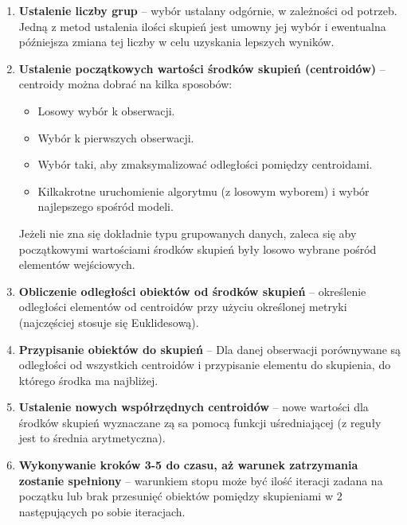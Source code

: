 \begin{enumerate}
	\item \textbf{Ustalenie liczby grup} -- wybór ustalany odgórnie, w zależności od potrzeb. Jedną z metod ustalenia ilości skupień jest umowny jej wybór i ewentualna późniejsza zmiana tej liczby w celu uzyskania lepszych wyników.
	\item \textbf{Ustalenie początkowych wartości środków skupień (centroidów)} -- centroidy można dobrać na kilka sposobów:
	\begin{itemize}
		\item Losowy wybór k obserwacji.
		\item Wybór k pierwszych obserwacji.
		\item Wybór taki, aby zmaksymalizować odległości pomiędzy centroidami.
		\item Kilkakrotne uruchomienie algorytmu (z losowym wyborem) i wybór najlepszego spośród modeli.
	\end{itemize}
		Jeżeli nie zna się dokładnie typu grupowanych danych, zaleca się aby początkowymi wartościami środków skupień były losowo wybrane pośród elementów wejściowych.
	\item \textbf{Obliczenie odległości obiektów od środków skupień} -- określenie odległości elementów od centroidów przy użyciu określonej metryki (najczęściej stosuje się Euklidesową).
	\item \textbf{Przypisanie obiektów do skupień} -- Dla danej obserwacji porównywane są odległości od wszystkich centroidów i przypisanie elementu do skupienia, do którego środka ma najbliżej.
	\item \textbf{Ustalenie nowych współrzędnych centroidów} -- nowe wartości dla środków skupień wyznaczane zą sa pomocą funkcji uśredniającej (z reguły jest to średnia arytmetyczna).
	\item \textbf{Wykonywanie kroków 3-5 do czasu, aż warunek zatrzymania zostanie spełniony} -- warunkiem stopu może być ilość iteracji zadana na początku lub brak przesunięć obiektów pomiędzy skupieniami w 2 następujących po sobie iteracjach.
\end{enumerate}